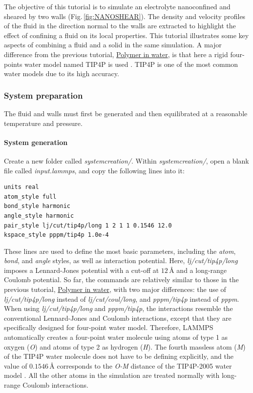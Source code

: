 \documentclass[9pt,tutorial]{livecoms}
\begin{document}
\noindent The objective of this tutorial is to simulate an electrolyte nanoconfined and sheared by two walls (Fig.\,\ref{fig:NANOSHEAR}). The density and velocity profiles of the fluid in the direction normal to the walls are extracted to highlight the effect of confining a fluid on its local properties. This tutorial illustrates some key aspects of combining a fluid and a solid in the same simulation. A major difference from the previous tutorial, \hyperref[all-atoms-label]{Polymer in water}, is that here a rigid four-points water model named TIP4P is used \cite{abascal2005general}. TIP4P is one of the most common water models due to its high accuracy.

\subsubsection{System preparation}
The fluid and walls must first be generated and then equilibrated at a reasonable temperature and pressure.

\paragraph{System generation}
Create a new folder called \textit{systemcreation/}. Within \textit{systemcreation/}, open a blank file called \textit{input.lammps}, and copy the following lines into it:
{\normalsize \begin{verbatim}
units real
atom_style full
bond_style harmonic
angle_style harmonic
pair_style lj/cut/tip4p/long 1 2 1 1 0.1546 12.0
kspace_style pppm/tip4p 1.0e-4
\end{verbatim}}
These lines are used to define the most basic parameters, including the \textit{atom}, \textit{bond}, and \textit{angle} styles, as well as interaction potential. Here, \textit{lj/cut/tip4p/long} imposes a Lennard-Jones potential with a cut-off at $12\,\text{$\text{\AA{}}$}$ and a long-range Coulomb potential. So far, the commands are relatively similar to those in the previous tutorial, \hyperref[all-atoms-label]{Polymer in water}, with two major differences: the use of \textit{lj/cut/tip4p/long} instead of \textit{lj/cut/coul/long}, and \textit{pppm/tip4p} instead of \textit{pppm}. When using \textit{lj/cut/tip4p/long} and \textit{pppm/tip4p}, the interactions resemble the conventional Lennard-Jones and Coulomb interactions, except that they are specifically designed for four-point water model. Therefore, LAMMPS automatically creates a four-point water molecule using atoms of type 1 as oxygen (\textit{O}) and atoms of type 2 as hydrogen (\textit{H}). The fourth massless atom (\textit{M}) of the TIP4P water molecule does not have to be defining explicitly, and the value of $0.1546\,\text{$\text{\AA{}}$}$ corresponds to the \textit{O-M} distance of the TIP4P-2005 water model \cite{abascal2005general}. All the other atoms in the simulation are treated normally with long-range Coulomb interactions.
\end{document}
